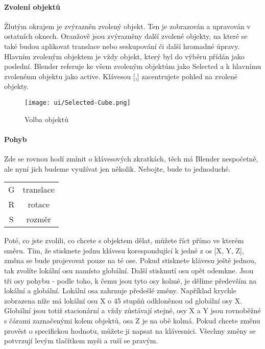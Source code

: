 \documentclass[12pt,a4paper]{report}
\begin{document}
	\paragraph{Zvolení objektů} Žlutým okrajem je zvýrazněn zvolený objekt. Ten je
	zobrazován a upravován v ostatních oknech. Oranžově jsou zvýrazněny
	další zvolené objekty, na které se také budou aplikovat translace nebo
	seskupování či další hromadné úpravy. Hlavním zvoleným objektem je
	vždy objekt, který byl do výběru přídán jako poslední. Blender referuje ke
	všem zvoleným objektům jako Selected a k hlavnímu zvolenému objektu
	jako active. Klávesou [,] zacentrujete pohled na zvolené objekty.
	
	\begin{figure}[h]
		\centering
		\texttt{[image: ui/Selected-Cube.png]}
		\caption{Volba objektů}
		\label{pic:cube-selection}
	\end{figure}

	\paragraph{Pohyb} Zde se rovnou hodí zmínit o klávesových zkratkách, těch má
Blender nespočetně, ale nyní jich budeme využívat jen několik. Nebojte,
bude to jednoduché.
	\newline \newline

	\begin{tabular}{cc}
		G & translace \\
		R & rotace \\
		S & rozměr
	\end{tabular}
	
	Poté, co jste zvolili, co chcete s objektem dělat, můžete říct přímo
	ve kterém směru. Tím, že stisknete jednu klávesu korespondující k jedné
	z os [X, Y, Z], změna se bude projevovat pouze na té ose. Pokud
	stisknete klávesu ještě jednou, tak zvolíte lokální osu namísto
	globální. Další stisknutí osu opět odemkne.
	Jsou tři osy pohybu - podle toho, k čemu jsou tyto osy kolmé, je dělíme
	především na lokální a globální. Lokální osa zahrnuje předešlé změny.
	Například krychle zobrazena níže má lokální osu X o 45 stupňů
	odkloněnou od globální osy X. Globální jsou totiž stacionární a vždy
	zůstávají stejné, osy X a Y jsou rovnoběžné s čárami zaznačenými kolem
	objektů, osa Z je na obě kolmá.
	Pokud chcete změnu provést o specifickou hodnotu, můžete ji napsat na
	klávesnici. Všechny změny se potvrzují levým tlačítkem myši a ruší se
	pravým.
	
\end{document}
